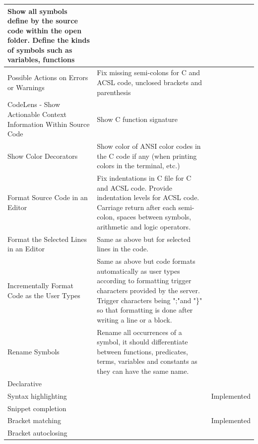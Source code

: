 \documentclass[10pt]{article}
\begin{document}
\begin{singlespace}
\begin{longtable}[H]{| p{2in} | p{2in} | p{2in} |}
  \multicolumn{1}{p{2in}|}{Show all symbols define by the source code within the open folder. Define the kinds of symbols such as variables, functions} &
   \\ \hline
\multicolumn{1}{|p{2in}|}{Possible Actions on Errors or Warnings} &
  \multicolumn{1}{p{2in}|}{Fix missing semi-colons for C and ACSL code, unclosed brackets and parenthesis} &
   \\ \hline
\multicolumn{1}{|p{2in}|}{CodeLens - Show Actionable Context Information Within Source Code} &
  \multicolumn{1}{p{2in}|}{Show C function signature} &
   \\ \hline
\multicolumn{1}{|p{2in}|}{Show Color Decorators} &
  \multicolumn{1}{p{2in}|}{Show color of ANSI color codes in the C code if any (when printing colors in the terminal, etc.)} &
   \\ \hline
\multicolumn{1}{|p{2in}|}{Format Source Code in an Editor} &
  \multicolumn{1}{p{2in}|}{Fix indentations in C file for C and ACSL code.  Provide indentation levels for ACSL code. Carriage return after each semi-colon, spaces between symbols, arithmetic and logic operators.} &
   \\ \hline
\multicolumn{1}{|p{2in}|}{Format the Selected Lines in an Editor} &
  \multicolumn{1}{p{2in}|}{Same as above but for selected lines in the code.} &
   \\ \hline
\multicolumn{1}{|p{2in}|}{Incrementally Format Code as the User Types} &
  \multicolumn{1}{p{2in}|}{Same as above but code formats automatically as user types according to formatting trigger characters provided by the server. Trigger characters being ";"and "\}" so that formatting is done after writing a line or a block.} &
   \\ \hline
\multicolumn{1}{|p{2in}|}{Rename Symbols} &
  \multicolumn{1}{p{2in}|}{Rename all occurrences of a symbol, it should differentiate between functions, predicates, terms, variables and constants as they can have the same name.} &
   \\ \hline
\multicolumn{3}{|l|}{Declarative} \\ \hline
\multicolumn{1}{|p{2in}|}{Syntax highlighting} &
  \multicolumn{1}{p{2in}|}{} &
  Implemented \\ \hline
\multicolumn{1}{|p{2in}|}{Snippet completion} &
  \multicolumn{1}{p{2in}|}{} &
   \\ \hline
\multicolumn{1}{|p{2in}|}{Bracket matching} &
  \multicolumn{1}{p{2in}|}{} &
  Implemented \\ \hline
\multicolumn{1}{|p{2in}|}{Bracket autoclosing} &

\end{longtable}
\end{singlespace}
\end{document}
